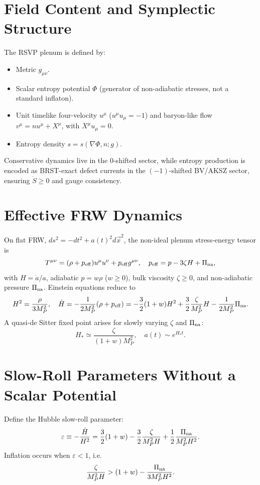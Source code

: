 \documentclass[12pt, a4paper, openany]{book}
\theoremstyle{definition}
\begin{document}
\section{Field Content and Symplectic Structure}
The RSVP plenum is defined by:
\begin{itemize}
    \item Metric $g_{\mu\nu}$.
    \item Scalar entropy potential $\Phi$ (generator of non-adiabatic stresses, not a standard inflaton).
    \item Unit timelike four-velocity $u^\mu$ ($u^\mu u_\mu=-1$) and baryon-like flow $v^\mu = n u^\mu + X^\mu$, with $X^\mu u_\mu=0$.
    \item Entropy density $s = s(\nabla\Phi, n; g)$.
\end{itemize}
Conservative dynamics live in the 0-shifted sector, while entropy production is encoded as BRST-exact defect currents in the $(-1)$-shifted BV/AKSZ sector, ensuring $\dot S \ge 0$ and gauge consistency.

\section{Effective FRW Dynamics}
On flat FRW, $ds^2=-dt^2 + a(t)^2 d\vec{x}^2$, the non-ideal plenum stress-energy tensor is
\begin{equation}
    T^{\mu\nu} = (\rho + p_{\rm eff}) u^\mu u^\nu + p_{\rm eff} g^{\mu\nu}, \quad p_{\rm eff} = p - 3 \zeta H + \Pi_{\rm na},
\end{equation}
with $H = \dot a / a$, adiabatic $p = w \rho$ ($w \ge 0$), bulk viscosity $\zeta \ge 0$, and non-adiabatic pressure $\Pi_{\rm na}$. Einstein equations reduce to
\begin{equation}
    H^2 = \frac{\rho}{3 M_P^2}, \quad \dot H = -\frac{1}{2 M_P^2} (\rho + p_{\rm eff}) = -\frac{3}{2}(1+w)H^2 + \frac{3}{2}\frac{\zeta}{M_P^2}H - \frac{1}{2 M_P^2} \Pi_{\rm na}.
\end{equation}
A quasi-de Sitter fixed point arises for slowly varying $\zeta$ and $\Pi_{\rm na}$:
\begin{equation}
    H_* \simeq \frac{\zeta}{(1+w) M_P^2}, \quad a(t) \sim e^{H_* t}.
\end{equation}

\section{Slow-Roll Parameters Without a Scalar Potential}
Define the Hubble slow-roll parameter:
\begin{equation}
    \varepsilon \equiv - \frac{\dot H}{H^2} = \frac{3}{2}(1+w) - \frac{3}{2}\frac{\zeta}{M_P^2 H} + \frac{1}{2}\frac{\Pi_{\rm na}}{M_P^2 H^2}.
\end{equation}
Inflation occurs when $\varepsilon < 1$, i.e.
\begin{equation}
    \frac{\zeta}{M_P^2 H} > (1+w) - \frac{\Pi_{\rm na}}{3 M_P^2 H^2}.
\end{equation}
\end{document}
